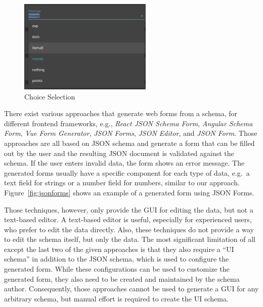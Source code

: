 \begin{figure}[htb]
\centering
\includegraphics[width=2.5in]{figures/gui_advantage_choiceselection}
\caption{Choice Selection}
\label{fig:gui_advantage_choiceselection}
\end{figure}

There exist various approaches that generate web forms from a schema, for different frontend frameworks, e.g.,
\textit{React JSON Schema Form}\cite{githubGitHubRjsfteamreactjsonschemaform},
\textit{Angular Schema Form}\cite{githubGitHubJsonschemaformangularschemaform},
\textit{Vue Form Generator}\cite{githubGitHubVuegeneratorsvueformgenerator},
\textit{JSON Forms}\cite{jsonformsMoreForms},
\textit{JSON Editor}\cite{jsoneditoronlineJSONEditor}, and
\textit{JSON Form}\cite{githubGitHubJsonformjsonform}.
Those approaches are all based on JSON schema and generate a form that can be filled out by the user and
the resulting JSON document is validated against the schema.
If the user enters invalid data, the form shows an error message.
The generated forms usually have a specific component for each type of data, e.g.\ a text field for strings or a number field for numbers,
similar to our approach.
Figure~\ref{fig:jsonforms} shows an example of a generated form using JSON Forms.

Those techniques, however, only provide the GUI for editing the data, but not a text-based editor.
A text-based editor is useful, especially for experienced users, who prefer to edit the data directly.
Also, these techniques do not provide a way to edit the schema itself, but only the data.
The most significant limitation of all except the last two of the given approaches is that they also require a ``UI schema'' in addition to the JSON schema, which is used to configure the generated form.
While these configurations can be used to customize the generated form, they also need to be created and maintained by the schema author.
Consequently, those approaches cannot be used to generate a GUI for any arbitrary schema, but manual effort is required to create the UI schema.

